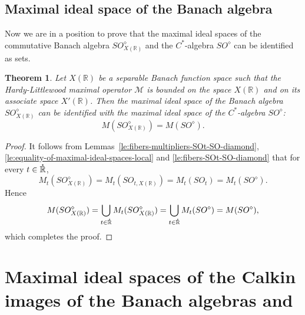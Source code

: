 \documentclass{birkjour}
\newtheorem{theorem}{Theorem}[section]
\numberwithin{equation}{section}
\newcommand{\R}{\mathbb{R}}
\newcommand{\cM}{\mathcal{M}}
\newcommand{\dR}{{\bf\dot{\R}}}
\begin{document}
\subsection{Maximal ideal space of the Banach algebra
\boldmath{$SO_{X(\R)}^\diamond$}}
Now we are in a position to prove that the maximal ideal spaces
of the commutative Banach algebra $SO_{X(\R)}^\diamond$ and
the $C^*$-algebra $SO^\diamond$ can be identified as sets.
\begin{theorem}
Let $X(\R)$ be a separable Banach function space such that the Hardy-Littlewood
maximal operator $\cM$ is bounded on the space $X(\R)$ and on its associate
space $X'(\R)$. Then the maximal ideal space of the Banach algebra
$SO_{X(\R)}^\diamond$ can be identified with the maximal ideal space
of the $C^*$-algebra $SO^\diamond$:
\[
M(SO_{X(\R)}^\diamond)=M(SO^\diamond).
\]
\end{theorem}
\begin{proof}
It follows from Lemmas~\ref{le:fibers-multipliers-SOt-SO-diamond},
\ref{le:equality-of-maximal-ideal-spaces-local} and
\ref{le:fibers-SOt-SO-diamond} that for every $t\in\dR$,
\[
M_t(SO_{X(\R)}^\diamond)=M_t(SO_{t,X(\R)})=M_t(SO_t)=M_t(SO^\diamond).
\]
Hence
\[
M(SO_{X(\R)}^\diamond)
=
\bigcup_{t\in\dR}M_t(SO_{X(\R)}^\diamond)
=
\bigcup_{t\in\dR}M_t(SO^\diamond)
=M(SO^\diamond),
\]
which completes the proof.
\end{proof}
\section{Maximal ideal spaces of the Calkin images of the Banach algebras
 and }
\label{sec:maximal-ideal-spaces-Calkin-images}
\end{document}
